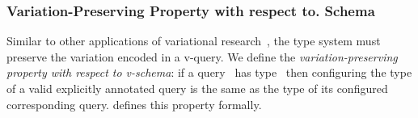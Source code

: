 \subsubsection{Variation-Preserving Property with respect to. Schema}
\label{sec:var-pres}


Similar to other applications of variational research~\cite{CEW16ecoop,CEW14toplas},
the type system must preserve
 the variation encoded in a v-query.
%
We define the 
\emph{variation-preserving property with respect to v-schema}: 
if a query \vQ\ has type \vType\ then 
configuring the type of a valid explicitly annotated query
is the same as the type of its configured
corresponding query. 
%
 defines this property formally.

